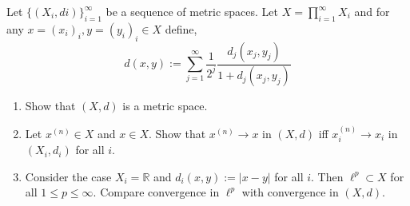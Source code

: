 \documentclass{article}
\newcommand{\R}{\mathbb{R}}
\theoremstyle{definition} %
\numberwithin{thm}{section} %
\theoremstyle{definition} %
\begin{document}
Let $\{(X_i, di)\}_{i = 1}^\infty$ be a sequence of metric spaces. 
Let $X = \prod_{i = 1}^\infty X_i$ and for any $x = (x_i)_i, y = (y_i)_i
\in X$ define,
\[
    d(x, y) := \sum_{j = 1}^\infty 
    \frac{1}{2^j}\frac{d_j(x_j, y_j)}{1 + d_j(x_j, y_j)}
\]
\begin{enumerate}[label=(\alph*)]
    \item Show that $(X, d)$ is a metric space.
    \item Let $x^{(n)} \in X$ and $x \in X$. Show that $x^{(n)} \to x$ 
    in $(X, d)$ iff $x^{(n)}_i \to x_i$ in $(X_i, d_i)$ for all $i$.
    \item Consider the case $X_i = \R$ and $d_i(x, y) := |x - y|$ 
    for all $i$. Then $\ell^p \subset X$ for all $1 \leq p \leq \infty$. 
    Compare convergence in $\ell^p$ with convergence in $(X, d)$.
\end{enumerate}
\end{document}
